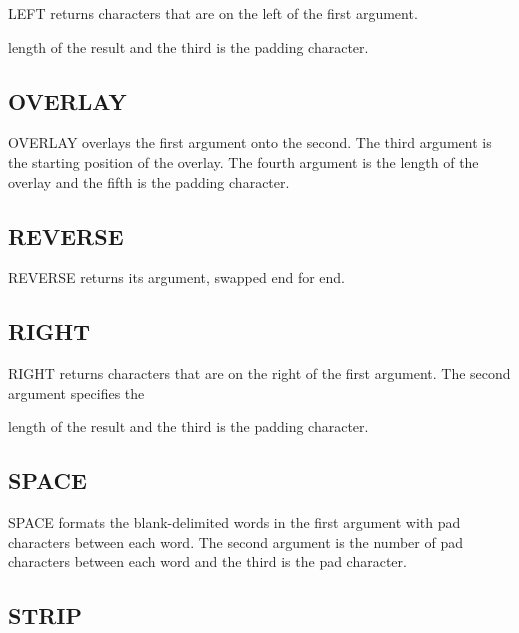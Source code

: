 LEFT returns characters that are on the left of the first argument.

length of the result and the third is the padding character.



\subsection{OVERLAY}\label{overlay}

OVERLAY overlays the first argument onto the second. The third argument
is the starting position of the overlay. The fourth argument is the
length of the overlay and the fifth is the padding character.



\subsection{REVERSE}\label{reverse}

REVERSE returns its argument, swapped end for end.



\subsection{RIGHT}\label{right}

RIGHT returns characters that are on the right of the first argument.
The second argument specifies the

length of the result and the third is the padding character.



\subsection{SPACE}\label{space}

SPACE formats the blank-delimited words in the first argument with pad
characters between each word. The second argument is the number of pad
characters between each word and the third is the pad character.



\subsection{STRIP}\label{strip}

